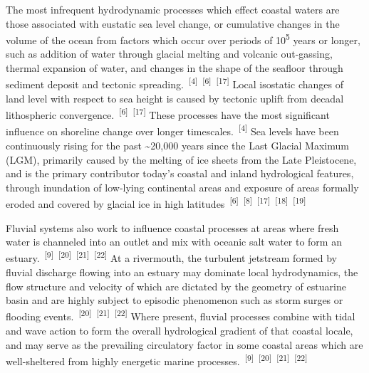 \documentclass{article}
\begin{document}

\par{The most infrequent hydrodynamic processes which effect coastal waters are those associated with eustatic sea level change, or cumulative changes in the volume of the ocean from factors which occur over periods of 10\textsuperscript{5} years or longer, such as addition of water through glacial melting and volcanic out-gassing, thermal expansion of water, and changes in the shape of the seafloor through sediment deposit and tectonic spreading.~\textsuperscript{[4]}~\textsuperscript{[6]}~\textsuperscript{[17]} Local isostatic changes of land level with respect to sea height is caused by tectonic uplift from decadal lithospheric convergence.~\textsuperscript{[6]}~\textsuperscript{[17]} These processes have the most significant influence on shoreline change over longer timescales.~\textsuperscript{[4]} Sea levels have been continuously rising for the past \textasciitilde20,000 years since the Last Glacial Maximum (LGM), primarily caused by the melting of ice sheets from the Late Pleistocene, and is the primary contributor today's coastal and inland hydrological features, through inundation of low-lying continental areas and exposure of areas formally eroded and covered by glacial ice in high latitudes~\textsuperscript{[6]}~\textsuperscript{[8]}~\textsuperscript{[17]}~\textsuperscript{[18]}~\textsuperscript{[19]}}


\par{Fluvial systems also work to influence coastal processes at areas where fresh water is channeled into an outlet and mix with oceanic salt water to form an estuary.~\textsuperscript{[9]}~\textsuperscript{[20]}~\textsuperscript{[21]}~\textsuperscript{[22]} At a rivermouth, the turbulent jetstream formed by fluvial discharge flowing into an estuary may dominate local hydrodynamics, the flow structure and velocity of which are dictated by the geometry of estuarine basin and are highly subject to episodic phenomenon such as storm surges or flooding events.~\textsuperscript{[20]}~\textsuperscript{[21]}~\textsuperscript{[22]} Where present, fluvial processes combine with tidal and wave action to form the overall hydrological gradient of that coastal locale, and may serve as the prevailing circulatory factor in some coastal areas which are well-sheltered from highly energetic marine processes.~\textsuperscript{[9]}~\textsuperscript{[20]}~\textsuperscript{[21]}~\textsuperscript{[22]}}
\end{document}
